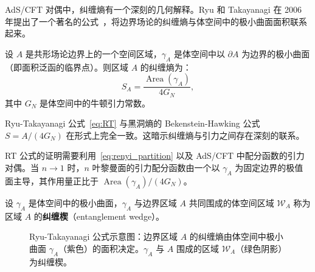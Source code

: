 AdS/CFT 对偶中，纠缠熵有一个深刻的几何解释。Ryu 和 Takayanagi 在 2006 年提出了一个著名的公式~\cite{Ryu2006}，将边界场论的纠缠熵与体空间中的极小曲面面积联系起来。

\begin{theorem}\label{thm:RT}
设 $A$ 是共形场论边界上的一个空间区域，$\gamma_A$ 是体空间中以 $\partial A$ 为边界的极小曲面（即面积泛函的临界点）。则区域 $A$ 的纠缠熵为：
\begin{equation}\label{eq:RT}
    S_A = \frac{\operatorname{Area}(\gamma_A)}{4G_N},
\end{equation}
其中 $G_N$ 是体空间中的牛顿引力常数。
\end{theorem}

\begin{remark}
Ryu-Takayanagi 公式~\eqref{eq:RT} 与黑洞熵的 Bekenstein-Hawking 公式 $S = A/(4G_N)$ 在形式上完全一致。这暗示纠缠熵与引力之间存在深刻的联系。
\end{remark}

RT 公式的证明需要利用~\eqref{eq:renyi_partition} 以及 AdS/CFT 中配分函数的引力对偶。当 $n \to 1$ 时，$n$ 叶黎曼面的引力配分函数由一个以 $\gamma_A$ 为固定边界的极值面主导，其作用量正比于 $\operatorname{Area}(\gamma_A)/(4G_N)$。

\begin{definition}[纠缠楔]
设 $\gamma_A$ 是体空间中的极小曲面，$\gamma_A$ 与边界区域 $A$ 共同围成的体空间区域 $\mathcal{W}_A$ 称为区域 $A$ 的\textbf{纠缠楔}（entanglement wedge）。
\end{definition}

\begin{figure}[htbp]
\centering
{}
\caption{Ryu-Takayanagi 公式示意图：边界区域 $A$ 的纠缠熵由体空间中极小曲面 $\gamma_A$（紫色）的面积决定。$\gamma_A$ 与 $A$ 围成的区域 $\mathcal{W}_A$（绿色阴影）为纠缠楔。}
\label{fig:RT}
\end{figure}

